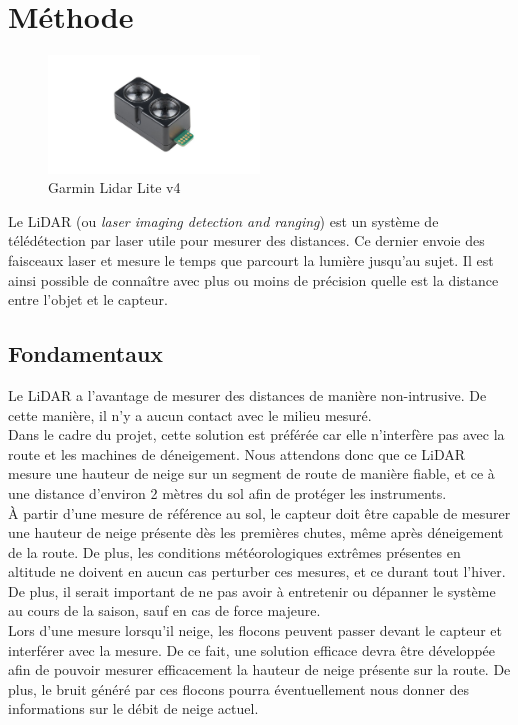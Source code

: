 \section{Méthode}

\begin{figure}[H]
    \centering
    \includegraphics[width=0.5\textwidth]{Images/LiDAR/GarminLiDARLiteV4.jpg}
    \caption{Garmin Lidar Lite v4}
    \label{fig:LiDARLiteV4}
\end{figure}

Le LiDAR (ou \emph{laser imaging detection and ranging}) est un système de télédétection par laser
utile pour mesurer des distances. Ce dernier envoie des faisceaux laser et mesure le temps que 
parcourt la lumière jusqu'au sujet. Il est ainsi possible de connaître avec plus ou moins de précision
quelle est la distance entre l'objet et le capteur.

\subsection{Fondamentaux}
Le LiDAR a l'avantage de mesurer des distances de manière non-intrusive. De cette manière, il n'y a 
aucun contact avec le milieu mesuré.\\
Dans le cadre du projet, cette solution est préférée car elle n'interfère pas avec la route et les 
machines de déneigement. Nous attendons donc que ce LiDAR mesure une hauteur de neige sur un 
segment de route de manière fiable, et ce à une distance d'environ 2 mètres du sol afin de protéger 
les instruments.\\
À partir d'une mesure de référence au sol, le capteur doit être capable de mesurer une hauteur de neige
présente dès les premières chutes, même après déneigement de la route. De plus, les conditions
météorologiques extrêmes présentes en altitude ne doivent en aucun cas perturber ces mesures, et ce
durant tout l'hiver. De plus, il serait important de ne pas avoir à entretenir ou dépanner le système
au cours de la saison, sauf en cas de force majeure.\\
Lors d'une mesure lorsqu'il neige, les flocons peuvent passer devant le capteur et interférer avec la
mesure. De ce fait, une solution efficace devra être développée afin de pouvoir mesurer efficacement
la hauteur de neige présente sur la route. De plus, le bruit généré par ces flocons pourra éventuellement
nous donner des informations sur le débit de neige actuel.

